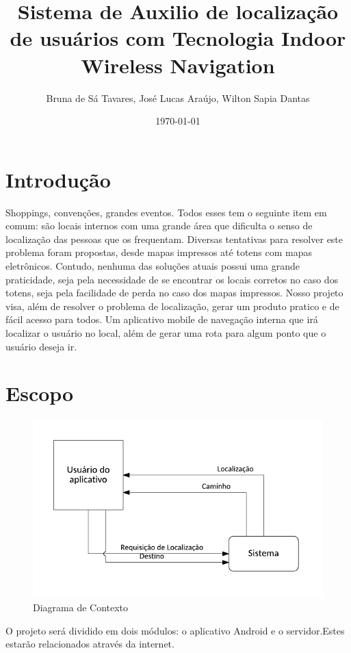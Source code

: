 \documentclass[12pt]{article}
\begin{document}
\title{Sistema de Auxilio de localização de usuários com Tecnologia Indoor Wireless Navigation}
\author{Bruna de Sá Tavares, José Lucas Araújo, Wilton Sapia Dantas}
\date{\today}
\maketitle  

\section*{Introdução}
	Shoppings, convenções, grandes eventos. Todos esses tem o seguinte item em comum: são locais internos com uma grande área que dificulta o senso de localização das pessoas que os frequentam. Diversas tentativas para resolver este problema foram propostas, desde mapas impressos até totens com mapas eletrônicos. Contudo, nenhuma das soluções atuais possui uma grande praticidade, seja pela necessidade de se encontrar os locais corretos no caso dos totens, seja pela facilidade de perda no caso dos mapas impressos. Nosso projeto visa, além de resolver o problema de localização, gerar um produto pratico e de fácil acesso para todos. Um aplicativo mobile de navegação interna que irá localizar o usuário no local, além de gerar uma rota para algum ponto que o usuário deseja ir.

\section*{Escopo}
	\begin{figure}
		\centering
		\includegraphics[scale=0.5]{diagramaContexto.PNG}
		\caption{Diagrama de Contexto}
	\end{figure}
	O projeto será dividido em dois módulos: o aplicativo Android e o servidor.Estes estarão relacionados através da internet.
	
\end{document}

